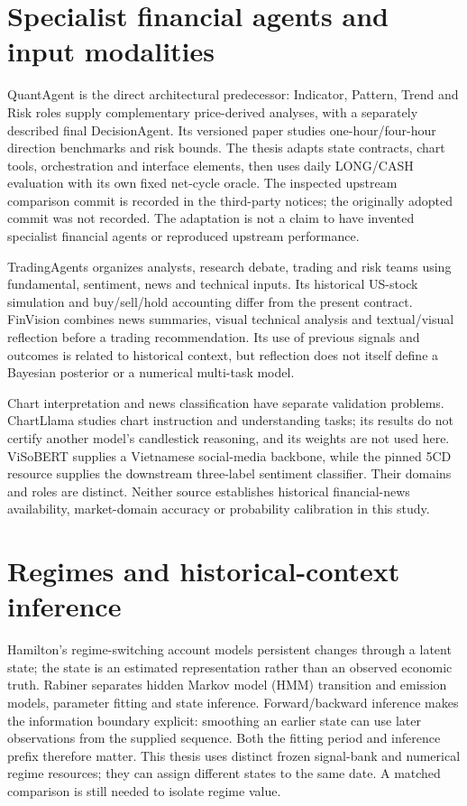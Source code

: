 \section{Specialist financial agents and input modalities}\label{s:f7594e9d067d74c3}
QuantAgent is the direct architectural predecessor: Indicator, Pattern,
Trend and Risk roles supply complementary price-derived analyses, with
a separately described final DecisionAgent. Its versioned paper studies
one-hour/four-hour direction benchmarks and risk bounds. The thesis
adapts state contracts, chart tools, orchestration and interface elements,
then uses daily LONG/CASH evaluation with its own fixed net-cycle oracle.
\autocite{xiong2025quantagent,yresearch2026quantagentcode} The inspected
upstream comparison commit is recorded in the third-party notices; the
originally adopted commit was not recorded. The adaptation is not a claim
to have invented specialist financial agents or reproduced upstream
performance.

TradingAgents organizes analysts, research debate, trading and risk teams
using fundamental, sentiment, news and technical inputs. Its historical
US-stock simulation and buy/sell/hold accounting differ from the present
contract. \autocite{tradingagents2024} FinVision combines news summaries,
visual technical analysis and textual/visual reflection before a trading
recommendation. Its use of previous signals and outcomes is related to
historical context, but reflection does not itself define a Bayesian
posterior or a numerical multi-task model. \autocite{fatemi2024finvision}

Chart interpretation and news classification have separate validation
problems. ChartLlama studies chart instruction and understanding tasks;
its results do not certify another model's candlestick reasoning, and its
weights are not used here. \autocite{han2023chartllama} ViSoBERT supplies
a Vietnamese social-media backbone, while the pinned 5CD resource supplies
the downstream three-label sentiment classifier. Their domains and roles
are distinct. Neither source establishes historical financial-news
availability, market-domain accuracy or probability calibration in this
study. \autocite{nguyen2023visobert,hf5cdsentiment}

\section{Regimes and historical-context inference}\label{s:72ac96e2a9d3b286}
Hamilton's regime-switching account models persistent changes through a
latent state; the state is an estimated representation rather than an
observed economic truth. \autocite{hamilton2005regimes} Rabiner separates hidden Markov model (HMM) transition and emission models, parameter fitting and state inference.
Forward/backward inference makes the information boundary explicit:
smoothing an earlier state can use later observations from the supplied
sequence. Both the fitting period and inference prefix therefore matter.
\autocite{rabiner1989hmm} This thesis uses distinct frozen signal-bank and
numerical regime resources; they can assign different states to the same
date. A matched comparison is still needed to isolate regime value.

